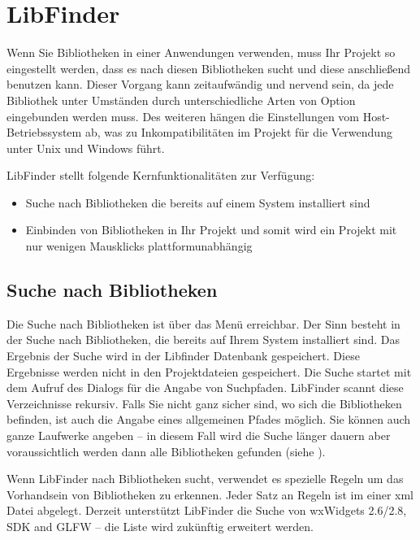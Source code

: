 \section{LibFinder}\label{sec:lib_finder}

Wenn Sie Bibliotheken in einer Anwendungen verwenden, muss Ihr Projekt so eingestellt werden, dass es nach diesen Bibliotheken sucht und diese anschließend benutzen kann. Dieser Vorgang kann zeitaufwändig und nervend sein, da jede Bibliothek unter Umständen durch unterschiedliche Arten von Option eingebunden werden muss. Des weiteren hängen die Einstellungen vom Host-Betriebssystem ab, was zu Inkompatibilitäten im Projekt für die Verwendung unter Unix und Windows führt.

LibFinder stellt folgende Kernfunktionalitäten zur Verfügung:

\begin{itemize}
\item Suche nach Bibliotheken die bereits auf einem System installiert sind
\item Einbinden von Bibliotheken in Ihr Projekt und somit wird ein Projekt mit nur wenigen Mausklicks plattformunabhängig
\end{itemize}

\subsection{Suche nach Bibliotheken}

Die Suche nach Bibliotheken ist über das Menü  erreichbar. Der Sinn besteht in der Suche nach Bibliotheken, die bereits auf Ihrem System installiert sind. Das Ergebnis der Suche wird in der Libfinder Datenbank gespeichert. Diese Ergebnisse werden nicht in den \codeblocks Projektdateien gespeichert. Die Suche startet mit dem Aufruf des Dialogs für die Angabe von Suchpfaden. LibFinder scannt diese Verzeichnisse rekursiv. Falls Sie nicht ganz sicher sind, wo sich die Bibliotheken befinden, ist auch die Angabe eines allgemeinen Pfades möglich. Sie können auch ganze Laufwerke angeben -- in diesem Fall wird die Suche länger dauern aber voraussichtlich werden dann alle Bibliotheken gefunden (siehe ).


Wenn LibFinder nach Bibliotheken sucht, verwendet es spezielle Regeln um das Vorhandsein von Bibliotheken zu erkennen. Jeder Satz an Regeln ist im einer xml Datei abgelegt. Derzeit unterstützt LibFinder die Suche von wxWidgets 2.6/2.8, \codeblocks SDK and GLFW -- die Liste wird zukünftig erweitert werden.

